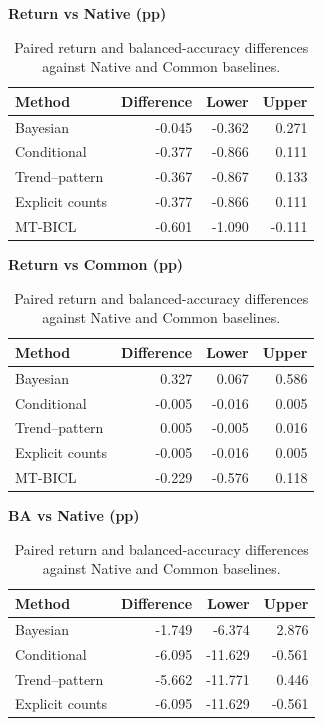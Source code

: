 \begin{table}[htb]
\centering\small
\setlength{\tabcolsep}{3pt}
\renewcommand{\arraystretch}{1.12}
\caption{Paired return and balanced-accuracy differences against Native and Common baselines.}
\label{tab:u09-contrasts}
\begin{minipage}[t]{0.48\textwidth}
\centering
\textbf{Return vs Native (pp)}\par\smallskip
\begin{tabular}{lrrr}
\hline
Method & Difference & Lower & Upper \\
\hline
Bayesian & -0.045 & -0.362 & 0.271 \\
Conditional & -0.377 & -0.866 & 0.111 \\
Trend--pattern & -0.367 & -0.867 & 0.133 \\
Explicit counts & -0.377 & -0.866 & 0.111 \\
MT-BICL & -0.601 & -1.090 & -0.111 \\
\hline
\end{tabular}
\end{minipage}\hfill
\begin{minipage}[t]{0.48\textwidth}
\centering
\textbf{Return vs Common (pp)}\par\smallskip
\begin{tabular}{lrrr}
\hline
Method & Difference & Lower & Upper \\
\hline
Bayesian & 0.327 & 0.067 & 0.586 \\
Conditional & -0.005 & -0.016 & 0.005 \\
Trend--pattern & 0.005 & -0.005 & 0.016 \\
Explicit counts & -0.005 & -0.016 & 0.005 \\
MT-BICL & -0.229 & -0.576 & 0.118 \\
\hline
\end{tabular}
\end{minipage}\par\medskip
\begin{minipage}[t]{0.48\textwidth}
\centering
\textbf{BA vs Native (pp)}\par\smallskip
\begin{tabular}{lrrr}
\hline
Method & Difference & Lower & Upper \\
\hline
Bayesian & -1.749 & -6.374 & 2.876 \\
Conditional & -6.095 & -11.629 & -0.561 \\
Trend--pattern & -5.662 & -11.771 & 0.446 \\
Explicit counts & -6.095 & -11.629 & -0.561 \\

\end{tabular}
\end{minipage}
\end{table}
